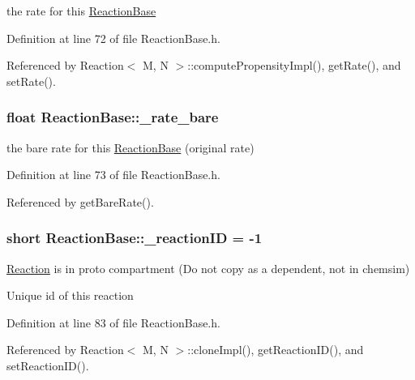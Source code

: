 the rate for this \hyperlink{classReactionBase}{Reaction\+Base} 



Definition at line 72 of file Reaction\+Base.\+h.



Referenced by Reaction$<$ M, N $>$\+::compute\+Propensity\+Impl(), get\+Rate(), and set\+Rate().

\hypertarget{classReactionBase_a7622cb447ce421d7d062d6bab1105aea}{
\subsubsection[{\+\_\+rate\+\_\+bare}]{\setlength{\rightskip}{0pt plus 5cm}float Reaction\+Base\+::\+\_\+rate\+\_\+bare\hspace{0.3cm}{\ttfamily [protected]}}}\label{classReactionBase_a7622cb447ce421d7d062d6bab1105aea}


the bare rate for this \hyperlink{classReactionBase}{Reaction\+Base} (original rate) 



Definition at line 73 of file Reaction\+Base.\+h.



Referenced by get\+Bare\+Rate().

\hypertarget{classReactionBase_a36d0a7b500e3df2944eb3ff61fa84617}{
\subsubsection[{\+\_\+reaction\+I\+D}]{\setlength{\rightskip}{0pt plus 5cm}short Reaction\+Base\+::\+\_\+reaction\+I\+D = -\/1\hspace{0.3cm}{\ttfamily [protected]}}}\label{classReactionBase_a36d0a7b500e3df2944eb3ff61fa84617}


\hyperlink{classReaction}{Reaction} is in proto compartment (Do not copy as a dependent, not in chemsim) 

Unique id of this reaction 

Definition at line 83 of file Reaction\+Base.\+h.



Referenced by Reaction$<$ M, N $>$\+::clone\+Impl(), get\+Reaction\+I\+D(), and set\+Reaction\+I\+D().

